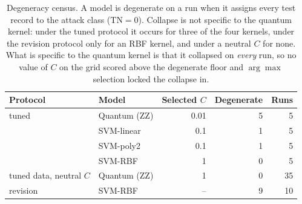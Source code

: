 \begin{table}[t]
\centering
\caption{Degeneracy census. A model is degenerate on a run when it
assigns every test record to the attack class ($\mathrm{TN}=0$).
Collapse is not specific to the quantum kernel: under the tuned
protocol it occurs for three of the four kernels, under the revision
protocol only for an RBF kernel, and under a neutral $C$ for none.
What is specific to the quantum kernel is that it collapsed on
\emph{every} run, so no value of $C$ on the grid scored above the
degenerate floor and $\arg\max$ selection locked the collapse in.}
\label{tab:degeneracy}
\begin{tabular}{l@{\hskip 1.2em}l@{\hskip 1.4em}r@{\hskip 1.4em}r@{\hskip 1.2em}r}
\toprule
Protocol & Model & Selected $C$ & Degenerate & Runs \\
\midrule
tuned & Quantum (ZZ) & 0.01 & 5 & 5 \\
 & SVM-linear & 0.1 & 1 & 5 \\
 & SVM-poly2 & 0.1 & 1 & 5 \\
 & SVM-RBF & 1 & 0 & 5 \\
\addlinespace[2pt]
tuned data, neutral $C$ & Quantum (ZZ) & 1 & 0 & 35 \\
\addlinespace[2pt]
revision & SVM-RBF & -- & 9 & 10 \\
\bottomrule
\end{tabular}
\end{table}
